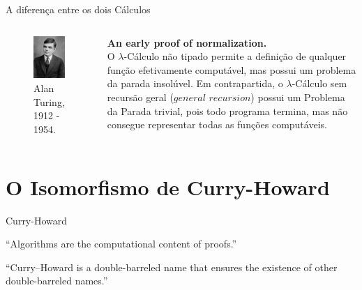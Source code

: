\documentclass{beamer}
\begin{document}
\begin{frame}{A diferença entre os dois Cálculos}
\begin{columns}
\centering
\begin{figure}
\includegraphics[width=4cm]{turing.jpg}
\caption*{Alan Turing, 1912 - 1954.}
\end{figure}
\textbf{An early proof of normalization. }\\
\justifying
O $\lambda$-Cálculo não tipado permite a definição de qualquer função efetivamente computável, mas possui um problema da parada insolúvel. Em contrapartida, o $\lambda$-Cálculo sem recursão geral ($\textit{general recursion}$) possui um Problema da Parada trivial, pois todo programa termina, mas não consegue representar todas as funções computáveis.

\end{columns} 
\end{frame}




\section{O Isomorfismo de Curry-Howard}

\begin{frame}{Curry-Howard}

\begin{exampleblock}{}
\justifying
  {\large ``Algorithms are the computational content of proofs.''}
  \vskip5mm
  \hspace*{}
\end{exampleblock}

\begin{exampleblock}{}
\justifying
  {\large ``Curry–Howard is a double-barreled name that ensures the existence of other double-barreled names.''}
  \vskip5mm
  \hspace*{}
\end{exampleblock}

\end{frame}
\end{document}
